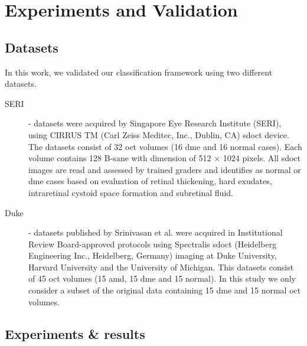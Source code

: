 
\section{Experiments and Validation }

\subsection{Datasets}

In this work, we validated our classification framework using two different datasets.

\begin{description}

\item[SERI]- datasets were acquired by Singapore Eye Research Institute (SERI), using CIRRUS TM (Carl Zeiss Meditec, Inc., Dublin, CA) \ac{sdoct} device. The datasets consist of 32 \ac{oct} volumes (16 \ac{dme} and 16 normal cases). Each volume contains 128 B-sane with  dimension of 512 $\times$ 1024 pixels.  All \ac{sdoct} images are read and assessed by trained graders and identifies as normal or \ac{dme} cases based on evaluation of retinal thickening, hard exudates, intraretinal cystoid space formation and subretinal fluid.

\item[Duke] - datasets published by Srinivasan et al. \cite{Srinivasan2014} were acquired in Institutional Review Board-approved protocols using Spectralis \ac{sdoct} (Heidelberg Engineering Inc., Heidelberg, Germany) imaging at Duke University, Harvard University and the University of Michigan. This datasets consist of 45 \ac{oct} volumes (15 \ac{amd}, 15 \ac{dme} and 15 normal). In this study we only consider a subset of the original data containing 15 \ac{dme} and 15 normal \ac{oct} volumes.

\end{description}

\subsection{Experiments \& results}

